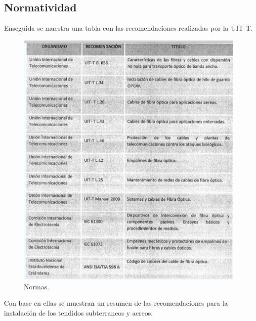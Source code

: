 \documentclass[12pt,letterpaper]{article}
\begin{document}
\newpage
\subsection{Normatividad}
Enseguida se muestra una tabla con las recomendaciones realizadas por la UIT-T.
\begin{figure}[ht]
    \centering
    \includegraphics[width=.7\textwidth]{imagenes/norm.PNG}
    \caption{Normas.}
\end{figure}

Con base en ellas se muestran un resumen de las recomendaciones para la instalación 
de los tendidos subterraneos y aereos.
\end{document}
